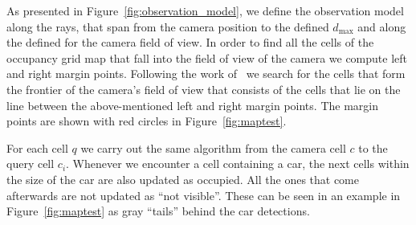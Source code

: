 \begin{figure}[t]%
\centering
{}\hspace{2mm}
\caption{}
\end{figure}

As presented in Figure~\ref{fig:observation_model}, we define the observation
model along the rays, that span from the camera position to the defined
$d_{\max}$ and along the defined for the camera field of view. In order to
find all the cells of the occupancy grid map that fall into the field of view
of the camera we compute left and right margin points. Following the work
of~\citet{bresenham1965} we search for the cells that form the frontier of the
camera's field of view that consists of the cells that lie on the line between
the above-mentioned left and right margin points. The margin points are shown
with red circles in Figure~\ref{fig:maptest}.

For each cell $q$ we carry out the same algorithm from the camera cell $c$ to
the query cell $c_i$. Whenever we encounter a cell containing a car, the next
cells within the size of the car are also updated as occupied. All the ones
that come afterwards are not updated as ``not visible''. These can be seen in
an example in Figure~\ref{fig:maptest} as gray ``tails'' behind the car
detections.


